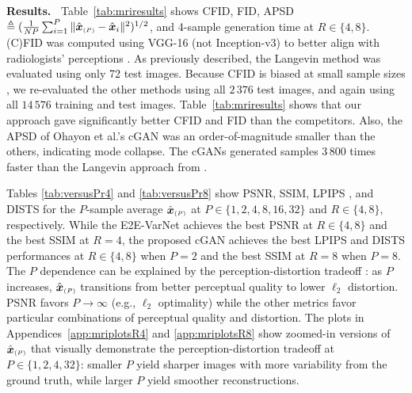 \documentclass{article}
\theoremstyle{plain}
\theoremstyle{definition}
\theoremstyle{remark}
\newcommand{\defn}{\triangleq}
\newcommand{\hvec}[1]{\ensuremath{\Hat{\boldsymbol{#1}}}}
\newcommand{\tabref}[1]{Table~\ref{tab:#1}}
\newcommand{\appref}[1]{Appendix~\ref{app:#1}}
\newcommand{\avgP}{_{\scriptscriptstyle (P)}}
\begin{document}
\textbf{Results.~} 
\tabref{mriresults} shows CFID, FID, APSD $\defn(\frac{1}{NP}\sum_{i=1}^{P} \|\hvec{x}\avgP-\hvec{x}_i\|^2)^{1/2}$, and 4-sample generation time at $R\in\{4,8\}$.
(C)FID was computed using VGG-16 (not Inception-v3) to better align with radiologists' perceptions \cite{Kastryulin:22}.
As previously described, the Langevin method was evaluated using only 72 test images.
Because CFID is biased at small sample sizes \cite{Soloveitchik:21}, we re-evaluated the other methods using all $2\,376$ test images, and again using all $14\,576$ training and test images. 
\tabref{mriresults} shows that our approach gave significantly better CFID and FID than the competitors.
Also, the APSD of Ohayon et al.'s cGAN was an order-of-magnitude smaller than the others, indicating mode collapse.
The cGANs generated samples $3\,800$ times faster than the Langevin approach from \cite{Jalal:NIPS:21}.

Tables \ref{tab:versusPr4} and \ref{tab:versusPr8} show PSNR, SSIM, LPIPS \cite{Zhang:CVPR:18}, and DISTS \cite{Ding:TPAMI:20} for the $P$-sample average $\hvec{x}\avgP$ at $P\in\{1,2,4,8,16,32\}$ and $R\in\{4,8\}$, respectively.
While the E2E-VarNet achieves the best PSNR at $R\in\{4,8\}$ and the best SSIM at $R=4$, the proposed cGAN achieves the best LPIPS and DISTS performances at $R\in\{4,8\}$ when $P=2$ and the best SSIM at $R=8$ when $P=8$. 
The $P$ dependence can be explained by the perception-distortion tradeoff \cite{Blau:CVPR:18}: as $P$ increases, $\hvec{x}\avgP$ transitions from better perceptual quality to lower $\ell_2$ distortion. 
PSNR favors $P\rightarrow\infty$ (e.g., $\ell_2$ optimality) while the other metrics favor particular combinations of perceptual quality and distortion.
The plots in Appendices~\ref{app:mriplotsR4} and \ref{app:mriplotsR8} show zoomed-in versions of $\hvec{x}\avgP$ that visually demonstrate the perception-distortion tradeoff at $P\in\{1,2,4,32\}$: smaller $P$ yield sharper images with more variability from the ground truth, while larger $P$ yield smoother reconstructions. 
\end{document}
